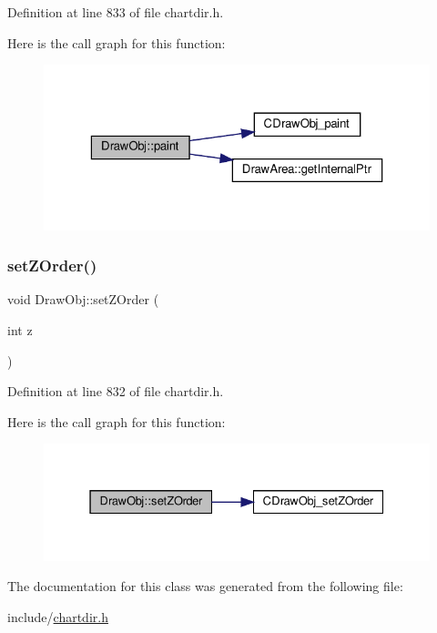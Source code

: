 Definition at line 833 of file chartdir.\+h.

Here is the call graph for this function\+:
\nopagebreak
\begin{figure}[H]
\begin{center}
\leavevmode
\includegraphics[width=323pt]{class_draw_obj_a66d19f8866cfccfa8aab406d7ddd070b_cgraph}
\end{center}
\end{figure}
\mbox{\label{class_draw_obj_adb8e1622c6454c93d1060440ea94789c}} 
\subsubsection{\texorpdfstring{set\+Z\+Order()}{setZOrder()}}
{\footnotesize\ttfamily void Draw\+Obj\+::set\+Z\+Order (\begin{DoxyParamCaption}\item[{int}]{z }\end{DoxyParamCaption})\hspace{0.3cm}{\ttfamily [inline]}}



Definition at line 832 of file chartdir.\+h.

Here is the call graph for this function\+:
\nopagebreak
\begin{figure}[H]
\begin{center}
\leavevmode
\includegraphics[width=331pt]{class_draw_obj_adb8e1622c6454c93d1060440ea94789c_cgraph}
\end{center}
\end{figure}


The documentation for this class was generated from the following file\+:\begin{DoxyCompactItemize}
\item 
include/\hyperlink{chartdir_8h}{chartdir.\+h}\end{DoxyCompactItemize}
